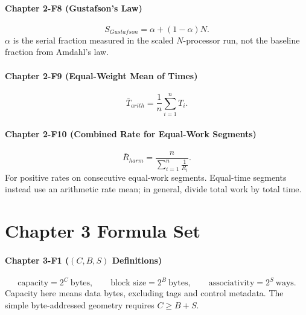\paragraph{Chapter 2-F8 (Gustafson's Law)}\label{par:auto-051}
\begin{equation}\label{eq:auto-062}
    S_{Gustafson}=\alpha+(1-\alpha)N.
\end{equation}
$\alpha$ is the serial fraction measured in the scaled $N$-processor run, not the baseline fraction from Amdahl's law.

\paragraph{Chapter 2-F9 (Equal-Weight Mean of Times)}\label{par:auto-052}
\begin{equation}\label{eq:auto-063}
    \bar{T}_{arith}=\frac{1}{n}\sum_{i=1}^{n}T_i.
\end{equation}

\paragraph{Chapter 2-F10 (Combined Rate for Equal-Work Segments)}\label{par:auto-053}
\begin{equation}\label{eq:auto-064}
    \bar{R}_{harm}=\frac{n}{\sum_{i=1}^{n}\frac{1}{R_i}}.
\end{equation}
For positive rates on consecutive equal-work segments. Equal-time segments instead use an arithmetic rate mean; in general, divide total work by total time.


\section*{Chapter 3 Formula Set}\label{sec:auto-058}

\paragraph{Chapter 3-F1 ($(C,B,S)$ Definitions)}\label{par:auto-054}
\begin{equation}\label{eq:auto-065}
    \text{capacity}=2^C\ \text{bytes},\qquad
    \text{block size}=2^B\ \text{bytes},\qquad
    \text{associativity}=2^S\ \text{ways}.
\end{equation}
Capacity here means data bytes, excluding tags and control metadata. The simple byte-addressed geometry requires $C\ge B+S$.

